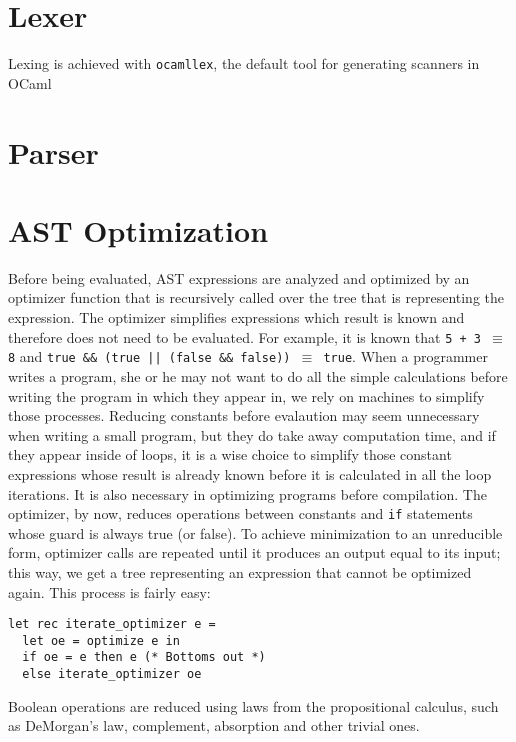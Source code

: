 \documentclass[a4paper, 11pt]{article}
\theoremstyle{plain}%
\theoremstyle{definition}
\theoremstyle{remark}
\begin{document}
\begin{multicols}{2}

\section{Lexer}

Lexing is achieved with \texttt{ocamllex}, the default tool for generating
scanners in OCaml

\section{Parser}

\section{AST Optimization}
Before being evaluated, AST expressions are analyzed and optimized by an
optimizer function that is recursively called over the tree that is representing
the expression. The optimizer simplifies expressions which result is known and
therefore does not need to be evaluated. For example, it is known that \texttt{5
+ 3 $\equiv$ 8} and \texttt{true \&\& (true || (false \&\& false)) $\equiv$
true}. When a programmer writes a program, she or he may not want to do all the
simple calculations before writing the program in which they appear in, we rely
on machines to simplify those processes. Reducing constants before evalaution
may seem unnecessary when writing a small program, but they do take away
computation time, and if they appear inside of loops, it is a wise choice to
simplify those constant expressions whose result is already known before it is
calculated in all the loop iterations. It is also necessary in optimizing
programs before compilation. The optimizer, by now, reduces operations between
constants and \texttt{if} statements whose guard is always true (or false). To
achieve minimization to an unreducible form, optimizer calls are repeated until
it produces an output equal to its input; this way, we get a tree representing
an expression that cannot be optimized again. This process is fairly easy:

\begin{lstlisting}[style=caml]
let rec iterate_optimizer e =
  let oe = optimize e in
  if oe = e then e (* Bottoms out *)
  else iterate_optimizer oe
\end{lstlisting}

Boolean operations are reduced using laws from the propositional calculus, such as DeMorgan's law, complement, absorption and other trivial ones.


\end{multicols}
\end{document}
